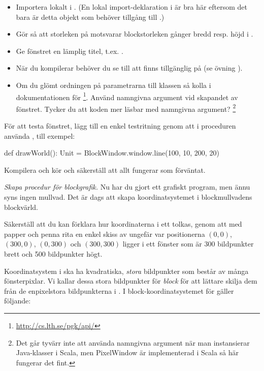 \begin{itemize}%
  \item Importera  lokalt i . (En lokal import-deklaration i är bra här eftersom det bara är detta objekt som behöver tillgång till .)
  \item Gör så att storleken på  motsvarar blockstorleken gånger bredd resp. höjd i .
  \item Ge fönstret en lämplig titel, t.ex. .
  \item När du kompilerar behöver du se till att  finns tillgänglig på  (se övning \texttt{\ExeWeekFOUR}).
  \item Om du glömt ordningen på parametrarna till klassen  så kolla i dokumentationen för  \footnote{\url{http://cs.lth.se/pgk/api/}}. Använd namngivna argument vid skapandet av fönstret. Tycker du att koden mer läsbar med namngivna argument? \footnote{Det går tyvärr inte att använda namngivna argument när man instansierar Java-klasser i Scala, men PixelWindow är implementerad i Scala så här fungerar det fint.}
\end{itemize}

För att testa fönstret, lägg till en enkel testritning genom att i proceduren  använda , till exempel:
\begin{Code}
  def drawWorld(): Unit = {
    BlockWindow.window.line(100, 10, 200, 20)
  }
\end{Code}
Kompilera och kör och säkerställ att allt fungerar som förväntat.


\Task \emph{Skapa procedur för blockgrafik.} Nu har du gjort ett grafiskt program, men ännu syns ingen mullvad.
Det är dags att skapa koordinatsystemet i blockmullvadens blockvärld.

\Subtask\Pen
Säkerställ att du kan förklara hur koordinaterna i ett  tolkas, genom att med papper och penna rita en enkel skiss av ungefär var positionerna $(0,0)$, $(300, 0)$, $(0, 300)$ och $(300, 300)$ ligger i ett fönster som är 300 bildpunkter brett och 500 bildpunkter högt.

\Subtask
Koordinatsystem i  ska ha kvadratiska, \emph{stora} bildpunkter som består av många fönsterpixlar. Vi kallar dessa stora bildpunkter för \emph{block} för att lättare skilja dem från de enpixelstora bildpunkterna i . I block-koordinatsystemet för  gäller följande:

